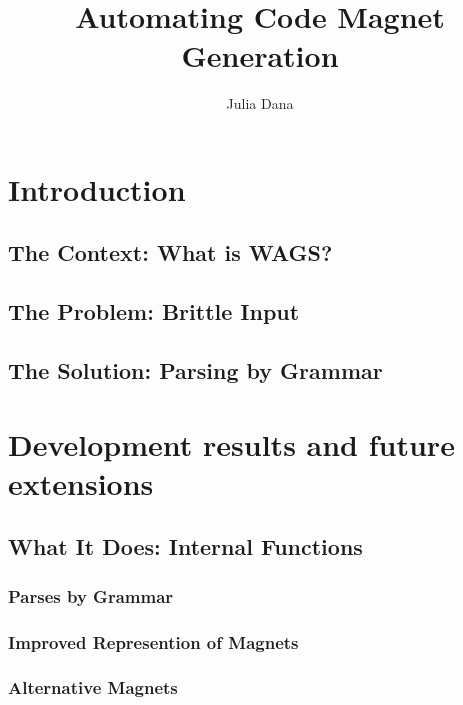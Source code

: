 \documentclass[letter,10pt]{article}
\title{Automating Code Magnet Generation}
\author{Julia Dana}
\date{}
\begin{document}
\maketitle


\pagebreak
\tableofcontents

\pagebreak

\section{Introduction}

\subsection{The Context: What is WAGS?}

\subsection{The Problem: Brittle Input}

\subsection{The Solution: Parsing by Grammar}



\section{Development results and future extensions}

\subsection{What It Does: Internal Functions}

\subsubsection{Parses by Grammar}

\subsubsection{Improved Represention of Magnets}

\subsubsection{Alternative Magnets}
\end{document}

